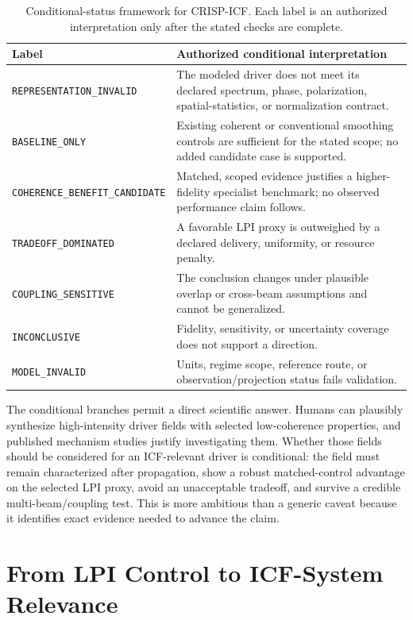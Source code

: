 \documentclass[conference]{../../../../Conference-LaTeX-template_10-17-19/IEEEtran}
\begin{document}
\begin{table}[!t]
\caption{Conditional-status framework for CRISP-ICF. Each label is an authorized interpretation only after the stated checks are complete.}
\label{tab:branches}
\centering
\footnotesize
\begin{tabularx}{\columnwidth}{lY}
\toprule
Label & Authorized conditional interpretation \\
\midrule
\texttt{REPRESENTATION\_INVALID} & The modeled driver does not meet its declared spectrum, phase, polarization, spatial-statistics, or normalization contract. \\
\texttt{BASELINE\_ONLY} & Existing coherent or conventional smoothing controls are sufficient for the stated scope; no added candidate case is supported. \\
\texttt{COHERENCE\_BENEFIT\_CANDIDATE} & Matched, scoped evidence justifies a higher-fidelity specialist benchmark; no observed performance claim follows. \\
\texttt{TRADEOFF\_DOMINATED} & A favorable LPI proxy is outweighed by a declared delivery, uniformity, or resource penalty. \\
\texttt{COUPLING\_SENSITIVE} & The conclusion changes under plausible overlap or cross-beam assumptions and cannot be generalized. \\
\texttt{INCONCLUSIVE} & Fidelity, sensitivity, or uncertainty coverage does not support a direction. \\
\texttt{MODEL\_INVALID} & Units, regime scope, reference route, or observation/projection status fails validation. \\
\bottomrule
\end{tabularx}
\end{table}

The conditional branches permit a direct scientific answer. Humans can plausibly synthesize high-intensity driver fields with selected low-coherence properties, and published mechanism studies justify investigating them. Whether those fields should be considered for an ICF-relevant driver is conditional: the field must remain characterized after propagation, show a robust matched-control advantage on the selected LPI proxy, avoid an unacceptable tradeoff, and survive a credible multi-beam/coupling test. This is more ambitious than a generic caveat because it identifies exact evidence needed to advance the claim.

\section{From LPI Control to ICF-System Relevance}
\end{document}
